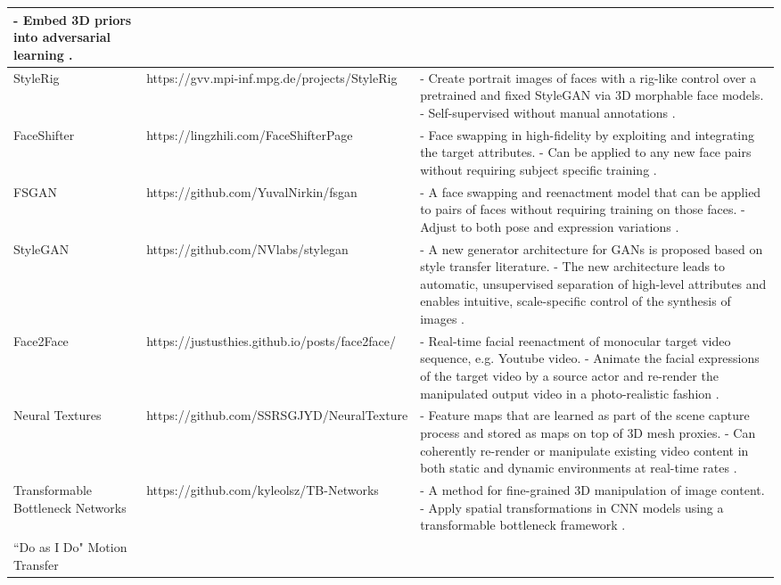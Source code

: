 \begin{table}
\begin{scriptsize}
\begin{tabular}{p{} p{} p{}}
- Embed 3D priors into adversarial learning .\\
\hline
StyleRig
& https://gvv.mpi-inf.mpg.de/projects/StyleRig
& -	Create portrait images of faces with a rig-like control over a pretrained and fixed StyleGAN via 3D morphable face models.\newline
- Self-supervised without manual annotations .\\
\hline
FaceShifter
& https://lingzhili.com/FaceShifterPage
& -	Face swapping in high-fidelity by exploiting and integrating the target attributes.\newline
- Can be applied to any new face pairs without requiring subject specific training .\\
\hline
FSGAN
& https://github.com/YuvalNirkin/fsgan
& -	A face swapping and reenactment model that can be applied to pairs of faces without requiring training on those faces.\newline
- Adjust to both pose and expression variations .\\
\hline
StyleGAN
& https://github.com/NVlabs/stylegan
& -	A new generator architecture for GANs is proposed based on style transfer literature.\newline
- The new architecture leads to automatic, unsupervised separation of high-level attributes and enables intuitive, scale-specific control of the synthesis of images .\\
\hline
Face2Face & https://justusthies.github.io/posts/face2face/ & - Real-time facial reenactment of monocular target video sequence, e.g. Youtube video.\newline
- Animate the facial expressions of the target video by a source actor and re-render the manipulated output video in a photo-realistic fashion .\\
\hline
Neural Textures & https://github.com/SSRSGJYD/NeuralTexture & 
- Feature maps that are learned as part of the scene capture process and stored as maps on top of {3D} mesh proxies.\newline
- Can coherently re-render or manipulate existing video content in both static and dynamic environments at real-time rates .\\
\hline
Transformable Bottleneck Networks
& https://github.com/kyleolsz/TB-Networks
& -	A method for fine-grained 3D manipulation of image content.\newline
- Apply spatial transformations in CNN models using a transformable bottleneck framework .\\
\hline
``Do as I Do" Motion \newline Transfer

\end{tabular}
\end{scriptsize}
\end{table}
